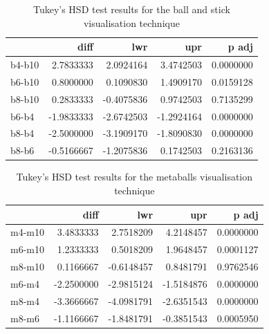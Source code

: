\begin{table}[h!]
  \begin{tabular}{ | l | r | r | r | r |}
  \hline
         &       diff &        lwr &        upr &     p adj  \\ \hline
  b4-b10 &  2.7833333 &  2.0924164 &  3.4742503 & 0.0000000  \\ \hline
  b6-b10 &  0.8000000 &  0.1090830 &  1.4909170 & 0.0159128  \\ \hline
  b8-b10 &  0.2833333 & -0.4075836 &  0.9742503 & 0.7135299  \\ \hline
  b6-b4  & -1.9833333 & -2.6742503 & -1.2924164 & 0.0000000  \\ \hline
  b8-b4  & -2.5000000 & -3.1909170 & -1.8090830 & 0.0000000  \\ \hline
  b8-b6  & -0.5166667 & -1.2075836 &  0.1742503 & 0.2163136  \\ \hline
  \end{tabular}
  \caption{Tukey's HSD test results for the ball and stick visualisation
  technique}
  \label{tab:experiment_ballstick_tukeyhsd}
\end{table}

\begin{table}[h!]
  \begin{tabular}{ | l | r | r | r | r |}
  \hline
         &       diff &        lwr &        upr &     p adj  \\ \hline
  m4-m10 &  3.4833333 &  2.7518209 &  4.2148457 & 0.0000000  \\ \hline
  m6-m10 &  1.2333333 &  0.5018209 &  1.9648457 & 0.0001127  \\ \hline
  m8-m10 &  0.1166667 & -0.6148457 &  0.8481791 & 0.9762546  \\ \hline
  m6-m4  & -2.2500000 & -2.9815124 & -1.5184876 & 0.0000000  \\ \hline
  m8-m4  & -3.3666667 & -4.0981791 & -2.6351543 & 0.0000000  \\ \hline
  m8-m6  & -1.1166667 & -1.8481791 & -0.3851543 & 0.0005950  \\ \hline
  \end{tabular}
  \caption{Tukey's HSD test results for the metaballs visualisation technique}
  \label{tab:experiment_metaballs_tukeyhsd}
\end{table}

